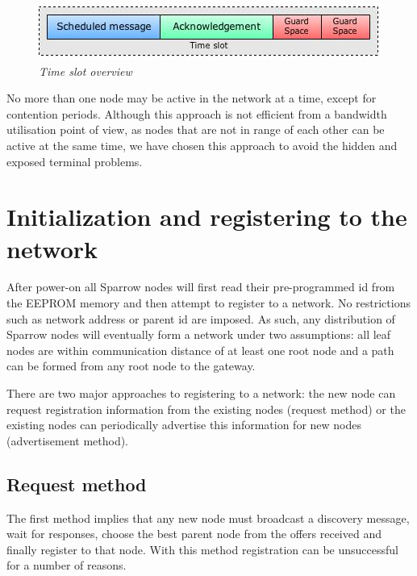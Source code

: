 \begin{figure}[ht]
	\begin{center}
		\includegraphics[width=\textwidth]{img/time_slot.jpg}
	\end{center}
	\caption{\small \itshape{Time slot overview}}
\end{figure}

No more than one node may be active in the network at a time, except for
contention periods. Although this approach is not efficient from a bandwidth utilisation point of view, as nodes that
are not in range of each other can be active at the same time, we have chosen
this approach to avoid the hidden and exposed terminal problems. 

\section{Initialization and registering to the network}
\label{sec:initialization_and_registering_into_the_network}

After power-on all Sparrow nodes will first read their pre-programmed id from the
\mbox{EEPROM} memory and then attempt to register to a network. No restrictions
such as network address or parent id are imposed. As such, any distribution of
Sparrow nodes will eventually form a network under two assumptions: all leaf nodes are within communication distance of at
least one root node and a path can be formed from any root node to the gateway.

There are two major approaches to registering to a network: the new node can
request registration information from the existing nodes (request method) or
the existing nodes can periodically advertise this information for new nodes
(advertisement method). 

\subsection{Request method}

The first method implies that any new node must broadcast a discovery message,
wait for responses, choose the best parent node from the offers received and
finally register to that node. With this method registration can be
unsuccessful for a number of reasons.


